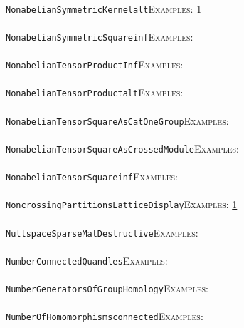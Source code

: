 \documentclass[a4paper,11pt]{report}
\begin{document}
{{ \\
 \texttt{NonabelianSymmetricKernel{\textunderscore}alt}{\nobreakspace}{\nobreakspace}{\nobreakspace}{\nobreakspace}\textsc{Examples:} \href{../www/SideLinks/About/aboutIntro.html} {1}{\nobreakspace} \\
 \\
 \texttt{NonabelianSymmetricSquare{\textunderscore}inf}{\nobreakspace}{\nobreakspace}{\nobreakspace}{\nobreakspace}\textsc{Examples:} \\
 \\
 \texttt{NonabelianTensorProduct{\textunderscore}Inf}{\nobreakspace}{\nobreakspace}{\nobreakspace}{\nobreakspace}\textsc{Examples:} \\
 \\
 \texttt{NonabelianTensorProduct{\textunderscore}alt}{\nobreakspace}{\nobreakspace}{\nobreakspace}{\nobreakspace}\textsc{Examples:} \\
 \\
 \texttt{NonabelianTensorSquareAsCatOneGroup}{\nobreakspace}{\nobreakspace}{\nobreakspace}{\nobreakspace}\textsc{Examples:} \\
 \\
 \texttt{NonabelianTensorSquareAsCrossedModule}{\nobreakspace}{\nobreakspace}{\nobreakspace}{\nobreakspace}\textsc{Examples:} \\
 \\
 \texttt{NonabelianTensorSquare{\textunderscore}inf}{\nobreakspace}{\nobreakspace}{\nobreakspace}{\nobreakspace}\textsc{Examples:} \\
 \\
 \texttt{NoncrossingPartitionsLatticeDisplay}{\nobreakspace}{\nobreakspace}{\nobreakspace}{\nobreakspace}\textsc{Examples:} \href{../www/SideLinks/About/aboutNoncrossing.html} {1}{\nobreakspace} \\
 \\
 \texttt{NullspaceSparseMatDestructive}{\nobreakspace}{\nobreakspace}{\nobreakspace}{\nobreakspace}\textsc{Examples:} \\
 \\
 \texttt{NumberConnectedQuandles}{\nobreakspace}{\nobreakspace}{\nobreakspace}{\nobreakspace}\textsc{Examples:} \\
 \\
 \texttt{NumberGeneratorsOfGroupHomology}{\nobreakspace}{\nobreakspace}{\nobreakspace}{\nobreakspace}\textsc{Examples:} \\
 \\
 \texttt{NumberOfHomomorphisms{\textunderscore}connected}{\nobreakspace}{\nobreakspace}{\nobreakspace}{\nobreakspace}\textsc{Examples:} \\
}}
\end{document}
